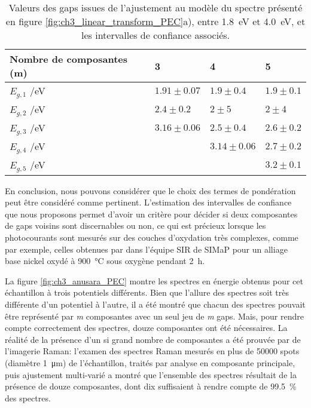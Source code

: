 \begin{refsection}
    \begin{table}[H] 
        \centering
        \begin{tabular}{p{}|%
                        p{}%
                        p{}%
                        p{}}
        \toprule
        Nombre de composantes (m) & 3 & 4 & 5 \\  \midrule
        $E_{g,1}$ /eV & $1.91 \pm 0.07$ & $ 1.9 \pm 0.4 $ & $1.9\pm0.1$ \\
        $E_{g,2}$ /eV & $2.4 \pm 0.2$ & $ 2 \pm 5 $ & $2\pm4$ \\
        $E_{g,3}$ /eV & $3.16 \pm 0.06$ & $ 2.5 \pm 0.4 $ & $2.6\pm0.2$ \\
        $E_{g,4}$ /eV &  & $ 3.14\pm 0.06 $ & $2.7\pm0.2$ \\
        $E_{g,5}$ /eV &  &  & $3.2\pm0.1$ \\
        \bottomrule
        \end{tabular}
        \caption{Valeurs des gaps issues de l'ajustement au modèle du spectre présenté en figure
        \ref{fig:ch3_linear_transform_PEC}a), entre \SI{1.8}{\electronvolt} et \SI{4.0}{\electronvolt}, et les
    intervalles de confiance associés.}
        \label{tab:ch3_fitted_parameters_2205}
    \end{table}

    En conclusion, nous pouvons considérer que le choix des termes de pondération peut être considéré comme pertinent.
    L'estimation des intervalles de confiance que nous proposons permet d'avoir un critère pour
    décider si deux composantes de gaps voisins sont discernables ou non, ce qui est précieux lorsque les photocourants
    sont mesurés sur des couches d'oxydation très complexes, comme par exemple, celles obtenues par \citet{Srisrual2013}
    dans l'équipe SIR de SIMaP pour un alliage base nickel oxydé à \SI{900}{\degreeCelsius} sous oxygène pendant 2~h.

    La figure \ref{fig:ch3_anusara_PEC} montre les spectres en énergie obtenus pour cet échantillon à trois potentiels
    différents. Bien que l'allure des spectres soit très différente d'un potentiel à l'autre, il a été montré que
    chacun des spectres pouvait être représenté par \emph{m} composantes avec un seul jeu de \emph{m} gaps. Mais, pour
    rendre compte correctement des spectres, douze composantes ont été nécessaires. La réalité de la présence d'un si grand
    nombre de composantes a été prouvée par de l'imagerie Raman: l'examen des spectres Raman mesurés en plus de 50000
    spots (diamètre \SI{1}{\micro\meter}) de l'échantillon, traités par analyse en composante principale, puis
    ajustement multi-varié a montré que l'ensemble des spectres résultait de la présence de douze composantes, dont dix
    suffisaient à rendre compte de 99.5~\% des spectres.


\end{refsection}
